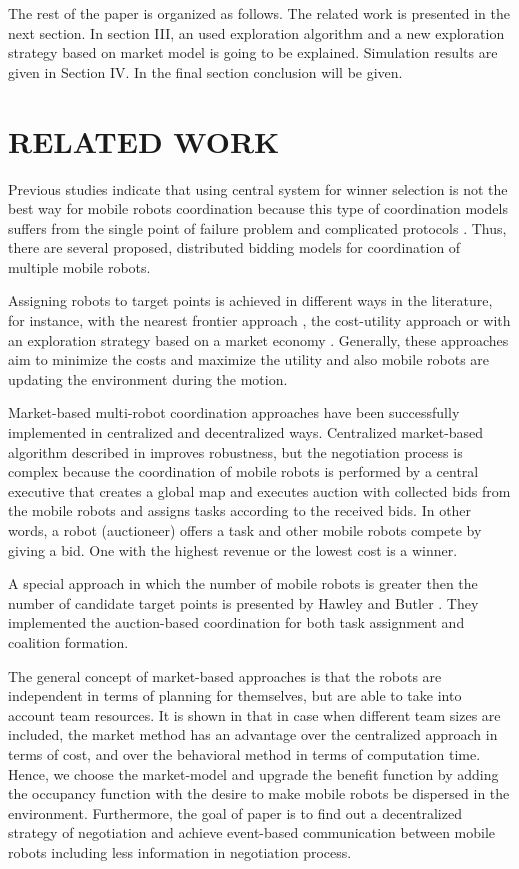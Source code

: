 \documentclass[letterpaper, 10 pt, conference]{ieeeconf}  %
\begin{document}
The rest of the paper is organized as follows. The related work is presented in the next section. In section III, an used exploration algorithm and a new exploration strategy based on market model is going to be explained. Simulation results are given in Section IV. In the final section conclusion will be given.



\section{RELATED WORK}


Previous studies indicate that using central system for winner selection is not the best way for mobile robots coordination because this type of coordination models suffers from the single point of failure problem and complicated protocols \cite{Sheng}. Thus, there are several proposed, distributed bidding models for coordination of multiple mobile robots. 

Assigning robots to target points is achieved in different ways in the literature, for instance, with the nearest frontier approach \cite{Yamauchi}, the cost-utility approach \cite{burgard} or  with an exploration strategy based on a market economy \cite{market-economy}. Generally, these approaches aim to minimize the costs and maximize the utility and also mobile robots are updating the environment during the motion.  

Market-based multi-robot coordination approaches have been successfully implemented in centralized and decentralized ways.
Centralized market-based algorithm described in \cite{burgard} improves robustness, but the negotiation process is complex because the coordination of mobile robots is performed by a central executive that creates a global map and executes auction with collected bids from the mobile robots and assigns tasks according to the received bids. In other words, a robot (auctioneer) offers a task and other mobile robots compete by giving a bid. One with the highest revenue or the lowest cost is a winner. 

A special approach in which the number of mobile robots is greater then the number of candidate target points is presented by Hawley and Butler \cite{Hawley}. They implemented the auction-based coordination for both task assignment and coalition formation. 
 
The general concept of market-based approaches is that the robots are independent in terms of planning for themselves, but are able to take into account team resources. It is shown in \cite{usporedba} that in case when different team sizes are included, the market method has an advantage over the centralized approach in terms of cost, and over the behavioral method in terms of computation time.
Hence, we choose the market-model and upgrade the benefit function by adding the occupancy function with the desire to make mobile robots be dispersed in the environment. Furthermore, the goal of paper is to find out a decentralized strategy of negotiation and achieve event-based communication between mobile robots including less information in negotiation process. 
\end{document}
